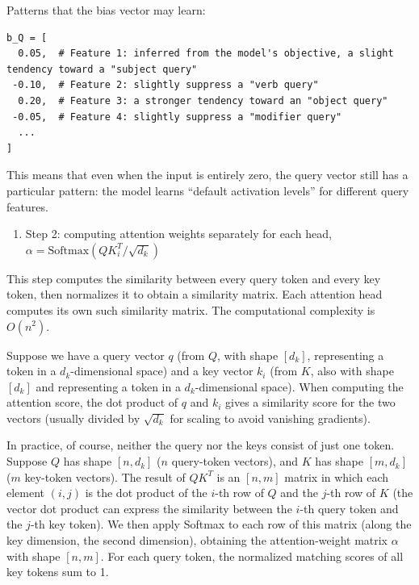 Patterns that the bias vector may learn:

\begin{verbatim}
b_Q = [
  0.05,  # Feature 1: inferred from the model's objective, a slight tendency toward a "subject query"
 -0.10,  # Feature 2: slightly suppress a "verb query"
  0.20,  # Feature 3: a stronger tendency toward an "object query"
 -0.05,  # Feature 4: slightly suppress a "modifier query"
  ...
]
\end{verbatim}

This means that even when the input is entirely zero, the query vector still has a particular pattern: the model learns ``default activation levels'' for different query features.

\begin{enumerate}
\def\labelenumi{\arabic{enumi}.}
\setcounter{enumi}{1}
\tightlist
\item
  Step 2: computing attention weights separately for each head, \(\alpha=\mathrm{Softmax}\left(QK_i^T/\sqrt{d_k}\right)\)
\end{enumerate}

This step computes the similarity between every query token and every key token, then normalizes it to obtain a similarity matrix. Each attention head computes its own such similarity matrix. The computational complexity is \(O(n^2)\).

Suppose we have a query vector \(q\) (from \(Q\), with shape \([d_k]\), representing a token in a \(d_k\)-dimensional space) and a key vector \(k_i\) (from \(K\), also with shape \([d_k]\) and representing a token in a \(d_k\)-dimensional space). When computing the attention score, the dot product of \(q\) and \(k_i\) gives a similarity score for the two vectors (usually divided by \(\sqrt{d_k}\) for scaling to avoid vanishing gradients).

In practice, of course, neither the query nor the keys consist of just one token. Suppose \(Q\) has shape \([n,d_k]\) (\(n\) query-token vectors), and \(K\) has shape \([m,d_k]\) (\(m\) key-token vectors). The result of \(QK^T\) is an \([n,m]\) matrix in which each element \((i,j)\) is the dot product of the \(i\)-th row of \(Q\) and the \(j\)-th row of \(K\) (the vector dot product can express the similarity between the \(i\)-th query token and the \(j\)-th key token). We then apply Softmax to each row of this matrix (along the key dimension, the second dimension), obtaining the attention-weight matrix \(\alpha\) with shape \([n,m]\). For each query token, the normalized matching scores of all key tokens sum to 1.

